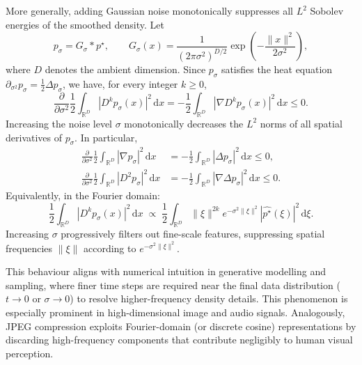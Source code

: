 \documentclass{article}
\newcommand{\R}{\mathbb{R}}
\newcommand{\dd}{\,\mathrm{d}}
\theoremstyle{plain}
\theoremstyle{definition}
\theoremstyle{remark}
\begin{document}
More generally, adding Gaussian noise monotonically suppresses all $L^2$ Sobolev energies of the smoothed density. Let
\begin{equation}
    p_\sigma = G_\sigma * p^\star,
    \qquad
    G_\sigma(x)
    =
    \frac{1}{(2\pi\sigma^2)^{D/2}}
    \exp\!\left(-\frac{\|x\|^2}{2\sigma^2}\right),
\end{equation}
where $D$ denotes the ambient dimension. Since $p_\sigma$ satisfies the heat equation $\partial_{\sigma^2} p_\sigma = \frac{1}{2} \Delta p_\sigma$, we have, for every integer $k \geq 0$,
\begin{equation}
    \frac{\partial}{\partial \sigma^2}
    \frac{1}{2}\int_{\R^D}
    \left|D^k p_\sigma(x)\right|^2 \dd x
    =
    -\frac{1}{2}
    \int_{\R^D}
    \left|\nabla D^k p_\sigma(x)\right|^2 \dd x
    \leq 0.
    \label{eq:sobolev-monotonicity}
\end{equation}
Increasing the noise level $\sigma$ monotonically decreases the $L^2$ norms of all spatial derivatives of $p_\sigma$. In particular,
\begin{align}
    \frac{\partial}{\partial \sigma^2}
    \frac{1}{2}\int_{\R^D} |\nabla p_\sigma|^2 \dd x
    &=
    -\frac{1}{2}\int_{\R^D} |\Delta p_\sigma|^2 \dd x
    \leq 0, \\
    \frac{\partial}{\partial \sigma^2}
    \frac{1}{2}\int_{\R^D} |D^2 p_\sigma|^2 \dd x
    &=
    -\frac{1}{2}\int_{\R^D} |\nabla \Delta p_\sigma|^2 \dd x
    \leq 0.
\end{align}
Equivalently, in the Fourier domain:
\begin{equation}
    \frac{1}{2}\int_{\R^D}
    |D^k p_\sigma(x)|^2 \dd x
    \;\propto\;
    \frac{1}{2}\int_{\R^D}
    \|\xi\|^{2k}
    e^{-\sigma^2\|\xi\|^2}
    \left|\widehat{p^\star}(\xi)\right|^2 \dd \xi.
    \label{eq:fourier-sobolev}
\end{equation}
Increasing $\sigma$ progressively filters out fine-scale features, suppressing spatial frequencies $\|\xi\|$ according to $e^{-\sigma^2\|\xi\|^2}$.

This behaviour aligns with numerical intuition in generative modelling and sampling, where finer time steps are required near the final data distribution ($t \to 0$ or $\sigma \to 0$) to resolve higher-frequency density details. This phenomenon is especially prominent in high-dimensional image and audio signals. Analogously, JPEG compression exploits Fourier-domain (or discrete cosine) representations by discarding high-frequency components that contribute negligibly to human visual perception.
\end{document}
